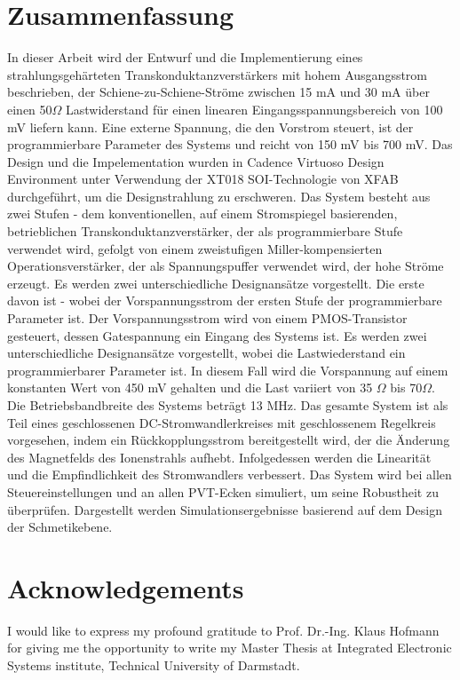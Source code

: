 \documentclass[linedtoc,
               parskip,
               twoside,
               longdoc,
               11pt,
               noheadingspace,
               accentcolor=tud1d,
               bigchapter,
               colorback]{tudreport}
\begin{document}
\chapter*{Zusammenfassung}

In dieser Arbeit wird der Entwurf und die Implementierung eines strahlungsgeh\"arteten Transkonduktanzverst\"arkers mit hohem Ausgangsstrom beschrieben, der Schiene-zu-Schiene-Str\"ome zwischen 15 mA und 30 mA \"uber einen 50$\Omega$ Lastwiderstand f\"ur einen linearen Eingangsspannungsbereich von 100 mV liefern kann. Eine externe Spannung, die den Vorstrom steuert, ist der programmierbare Parameter des Systems und reicht von 150 mV bis 700 mV. Das Design und die Impelementation wurden in Cadence Virtuoso Design Environment unter Verwendung der XT018 SOI-Technologie von XFAB durchgef\"uhrt, um die Designstrahlung zu erschweren. Das System besteht aus zwei Stufen - dem konventionellen, auf einem Stromspiegel basierenden, betrieblichen Transkonduktanzverst\"arker, der als programmierbare Stufe verwendet wird, gefolgt von einem zweistufigen Miller-kompensierten Operationsverst\"arker, der als Spannungspuffer verwendet wird, der hohe Str\"ome erzeugt. Es werden zwei unterschiedliche Designansätze vorgestellt. Die erste davon ist - wobei der Vorspannungsstrom der ersten Stufe der programmierbare Parameter ist. Der Vorspannungsstrom wird von einem PMOS-Transistor gesteuert, dessen Gatespannung ein Eingang des Systems ist. Es werden zwei unterschiedliche Designansätze vorgestellt, wobei die Lastwiederstand ein programmierbarer Parameter ist. In diesem Fall wird die Vorspannung auf einem konstanten Wert von 450 mV gehalten und die Last variiert von 35 $\Omega$ bis 70$\Omega$. Die Betriebsbandbreite des Systems betr\"agt 13 MHz. Das gesamte System ist als Teil eines geschlossenen DC-Stromwandlerkreises mit geschlossenem Regelkreis vorgesehen, indem ein R\"uckkopplungsstrom bereitgestellt wird, der die \"Anderung des Magnetfelds des Ionenstrahls aufhebt. Infolgedessen werden die Linearit\"at und die Empfindlichkeit des Stromwandlers verbessert. Das System wird bei allen Steuereinstellungen und an allen PVT-Ecken simuliert, um seine Robustheit zu \"uberpr\"ufen. Dargestellt werden Simulationsergebnisse basierend auf dem Design der Schmetikebene.

\chapter*{Acknowledgements}
I would like to express my profound gratitude to Prof. Dr.-Ing. Klaus Hofmann for giving me the opportunity to write my Master Thesis at Integrated Electronic Systems institute, Technical University of Darmstadt.
 
\end{document}
